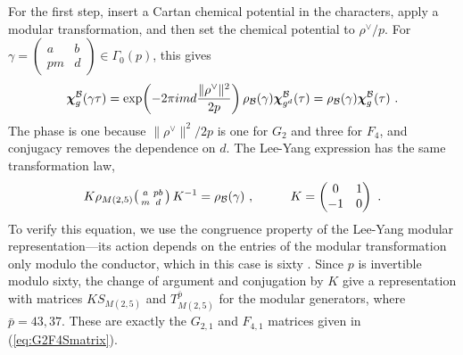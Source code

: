 \documentclass[12pt]{article}
\numberwithin{equation}{section}
\newcommand{\bea}{\begin{eqnarray}}
\newcommand{\eea}{\end{eqnarray}}
\theoremstyle{remark}
\begin{document}
For the first step, insert a Cartan chemical potential in the characters, apply a modular transformation, and then set the chemical potential to $\rho^\vee/p$. For $\gamma=\left(\begin{smallmatrix}a&b\\pm&d\end{smallmatrix}\right)\in\Gamma_0(p)$, this gives
\bea
\boldsymbol{\chi}^{\mathcal B}_g(\gamma\tau)=\exp\!\left(-2\pi i md{\|\rho^\vee\|^2\over2p}\right)\rho_{\mathcal B}(\gamma)\boldsymbol{\chi}^{\mathcal B}_{g^d}(\tau)=\rho_{\mathcal B}(\gamma)\boldsymbol{\chi}^{\mathcal B}_g(\tau)~.
\eea
The phase is one because $\|\rho^\vee\|^2/2p$ is one for $G_2$ and three for $F_4$, and conjugacy removes the dependence on $d$. The Lee-Yang expression has the same transformation law,
\bea
K\rho_{M(2,5)}\!\left(\begin{smallmatrix}a&pb\\m&d\end{smallmatrix}\right)K^{-1}=\rho_{\mathcal B}(\gamma)~,
\hspace{0.4 in}K=\begin{pmatrix}0&1\\-1&0\end{pmatrix}~.
\eea
To verify this equation, we use the congruence property of the Lee-Yang modular representation---its action depends on the entries of the modular transformation only modulo the conductor, which in this case is sixty  \cite{Bantay:2001ni}. Since $p$ is invertible modulo sixty, the change of argument and conjugation by $K$ give a representation with matrices $KS_{M(2,5)}$ and $T_{M(2,5)}^{\bar p}$ for the modular generators, where $\bar p=43,37$. These are exactly the $G_{2,1}$ and $F_{4,1}$ matrices given in (\ref{eq:G2F4Smatrix}).
\end{document}
